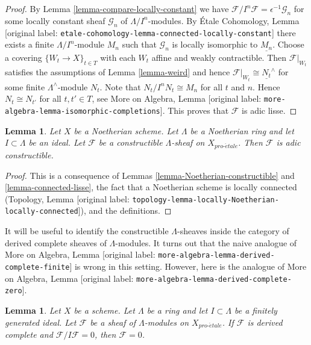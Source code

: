 \documentclass[10pt,a4paper]{article}
\theoremstyle{plain}
\newtheorem{lemma}[subsection]{Lemma}
\theoremstyle{definition}
\theoremstyle{remark}
\numberwithin{equation}{subsection}
\def\proetale{{pro\text{-}\acute{e}tale}}
\begin{document}
\begin{proof}
By Lemma \ref{lemma-compare-locally-constant} we have
$\mathcal{F}/I^n\mathcal{F} = \epsilon^{-1}\mathcal{G}_n$
for some locally constant sheaf $\mathcal{G}_n$ of $\Lambda/I^n$-modules. By
\'Etale Cohomology, Lemma
\textnormal{[original label: \nolinkurl{etale-cohomology-lemma-connected-locally-constant}]}
there exists a finite $\Lambda/I^n$-module $M_n$ such that
$\mathcal{G}_n$ is locally isomorphic to $\underline{M_n}$.
Choose a covering $\{W_t \to X\}_{t \in T}$ with each $W_t$
affine and weakly contractible.
Then $\mathcal{F}|_{W_t}$ satisfies the assumptions of
Lemma \ref{lemma-weird}
and hence $\mathcal{F}|_{W_t} \cong \underline{N_t}^\wedge$
for some finite $\Lambda^\wedge$-module $N_t$. Note that
$N_t/I^nN_t \cong M_n$ for all $t$ and $n$. Hence
$N_t \cong N_{t'}$ for all $t, t' \in T$, see
More on Algebra, Lemma \textnormal{[original label: \nolinkurl{more-algebra-lemma-isomorphic-completions}]}.
This proves that $\mathcal{F}$ is adic lisse.
\end{proof}

\begin{lemma}
\label{lemma-Noetherian-adic-constructible}
Let $X$ be a Noetherian scheme. Let $\Lambda$ be a Noetherian ring and
let $I \subset \Lambda$ be an ideal. Let $\mathcal{F}$ be a
constructible $\Lambda$-sheaf on $X_\proetale$. Then $\mathcal{F}$
is adic constructible.
\end{lemma}

\begin{proof}
This is a consequence of Lemmas \ref{lemma-Noetherian-constructible} and
\ref{lemma-connected-lisse}, the fact that a Noetherian scheme
is locally connected
(Topology, Lemma \textnormal{[original label: \nolinkurl{topology-lemma-locally-Noetherian-locally-connected}]}),
and the definitions.
\end{proof}

\noindent
It will be useful to identify the constructible $\Lambda$-sheaves
inside the category of derived complete sheaves of $\Lambda$-modules.
It turns out that the naive analogue of
More on Algebra, Lemma \textnormal{[original label: \nolinkurl{more-algebra-lemma-derived-complete-finite}]}
is wrong in this setting. However, here
is the analogue of More on Algebra, Lemma
\textnormal{[original label: \nolinkurl{more-algebra-lemma-derived-complete-zero}]}.

\begin{lemma}
\label{lemma-derived-complete-zero}
Let $X$ be a scheme. Let $\Lambda$ be a ring and let
$I \subset \Lambda$ be a finitely generated ideal.
Let $\mathcal{F}$ be a sheaf of $\Lambda$-modules on $X_\proetale$.
If $\mathcal{F}$ is derived complete and $\mathcal{F}/I\mathcal{F} = 0$,
then $\mathcal{F} = 0$.
\end{lemma}
\end{document}
